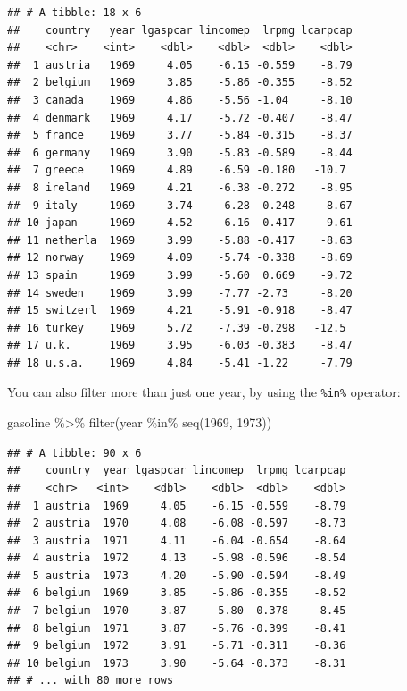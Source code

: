 \documentclass[
]{article}
\newenvironment{Shaded}{\begin{snugshade}}{\end{snugshade}}
\newcommand{\DecValTok}[1]{\textcolor[rgb]{0.00,0.00,0.81}{#1}}
\newcommand{\FunctionTok}[1]{\textcolor[rgb]{0.00,0.00,0.00}{#1}}
\newcommand{\NormalTok}[1]{#1}
\newcommand{\SpecialCharTok}[1]{\textcolor[rgb]{0.00,0.00,0.00}{#1}}
\begin{document}
\begin{verbatim}
## # A tibble: 18 x 6
##    country   year lgaspcar lincomep  lrpmg lcarpcap
##    <chr>    <int>    <dbl>    <dbl>  <dbl>    <dbl>
##  1 austria   1969     4.05    -6.15 -0.559    -8.79
##  2 belgium   1969     3.85    -5.86 -0.355    -8.52
##  3 canada    1969     4.86    -5.56 -1.04     -8.10
##  4 denmark   1969     4.17    -5.72 -0.407    -8.47
##  5 france    1969     3.77    -5.84 -0.315    -8.37
##  6 germany   1969     3.90    -5.83 -0.589    -8.44
##  7 greece    1969     4.89    -6.59 -0.180   -10.7 
##  8 ireland   1969     4.21    -6.38 -0.272    -8.95
##  9 italy     1969     3.74    -6.28 -0.248    -8.67
## 10 japan     1969     4.52    -6.16 -0.417    -9.61
## 11 netherla  1969     3.99    -5.88 -0.417    -8.63
## 12 norway    1969     4.09    -5.74 -0.338    -8.69
## 13 spain     1969     3.99    -5.60  0.669    -9.72
## 14 sweden    1969     3.99    -7.77 -2.73     -8.20
## 15 switzerl  1969     4.21    -5.91 -0.918    -8.47
## 16 turkey    1969     5.72    -7.39 -0.298   -12.5 
## 17 u.k.      1969     3.95    -6.03 -0.383    -8.47
## 18 u.s.a.    1969     4.84    -5.41 -1.22     -7.79
\end{verbatim}

You can also filter more than just one year, by using the \texttt{\%in\%} operator:

\begin{Shaded}
\begin{Highlighting}[]
\NormalTok{gasoline }\SpecialCharTok{\%\textgreater{}\%}
  \FunctionTok{filter}\NormalTok{(year }\SpecialCharTok{\%in\%} \FunctionTok{seq}\NormalTok{(}\DecValTok{1969}\NormalTok{, }\DecValTok{1973}\NormalTok{))}
\end{Highlighting}
\end{Shaded}

\begin{verbatim}
## # A tibble: 90 x 6
##    country  year lgaspcar lincomep  lrpmg lcarpcap
##    <chr>   <int>    <dbl>    <dbl>  <dbl>    <dbl>
##  1 austria  1969     4.05    -6.15 -0.559    -8.79
##  2 austria  1970     4.08    -6.08 -0.597    -8.73
##  3 austria  1971     4.11    -6.04 -0.654    -8.64
##  4 austria  1972     4.13    -5.98 -0.596    -8.54
##  5 austria  1973     4.20    -5.90 -0.594    -8.49
##  6 belgium  1969     3.85    -5.86 -0.355    -8.52
##  7 belgium  1970     3.87    -5.80 -0.378    -8.45
##  8 belgium  1971     3.87    -5.76 -0.399    -8.41
##  9 belgium  1972     3.91    -5.71 -0.311    -8.36
## 10 belgium  1973     3.90    -5.64 -0.373    -8.31
## # ... with 80 more rows
\end{verbatim}
\end{document}
